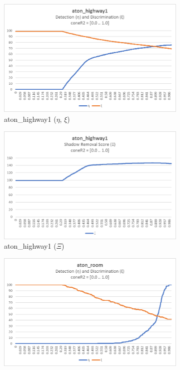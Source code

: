 \begin{figure}
\begin{subfigure}{.45\linewidth}
\end{subfigure}
\hfill
\begin{subfigure}{.45\linewidth}
  \includegraphics[width=1\linewidth]{figures/highway1_coneR2_response.jpg}
  \caption{aton\_highway1 ($\eta$, $\xi$)}
\end{subfigure}
\hfill
  \begin{subfigure}{.45\linewidth}
  \includegraphics[width=1\linewidth]{figures/highway1_coneR2_score.jpg}
  \caption{aton\_highway1 ($\Xi$)}
\end{subfigure}
\hfill
\begin{subfigure}{.45\linewidth}
  \includegraphics[width=1\linewidth]{figures/room_coneR2_response.jpg}

\end{subfigure}
\end{figure}
